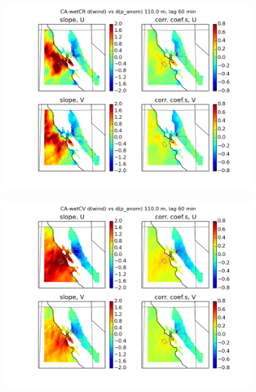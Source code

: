 \begin{figure}[here]
\begin{subfigure}{0.5\textwidth}
\includegraphics[width=\textwidth]{ch3-wind/img/corr_dwind_dpanom_lev110_lag2_wetCR.png}
\caption{}
\end{subfigure}
\begin{subfigure}{0.5\textwidth}
\includegraphics[width=\textwidth]{ch3-wind/img/corr_dwind_dpanom_lev110_lag2_wetCV.png}
\caption{}
\end{subfigure}
\begin{subfigure}{0.5\textwidth}

\end{subfigure}
\end{figure}
